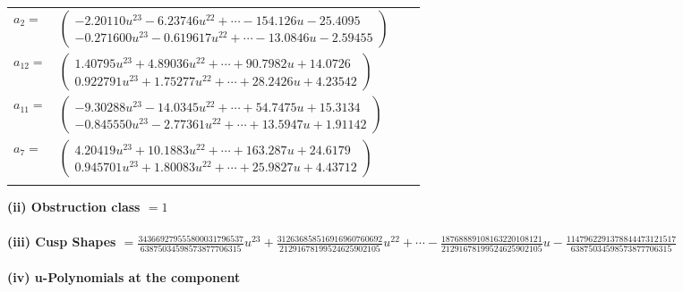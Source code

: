 \documentclass[1p]{elsarticle_modified}
\theoremstyle{definition}
\begin{document}
\begin{tabular}{m{7pt} m{180pt} m{7pt} m{180pt} }
\flushright $a_{2}=$&$\begin{pmatrix}-2.20110 u^{23}-6.23746 u^{22}+\cdots-154.126 u-25.4095\\-0.271600 u^{23}-0.619617 u^{22}+\cdots-13.0846 u-2.59455\end{pmatrix}$ \\
\flushright $a_{12}=$&$\begin{pmatrix}1.40795 u^{23}+4.89036 u^{22}+\cdots+90.7982 u+14.0726\\0.922791 u^{23}+1.75277 u^{22}+\cdots+28.2426 u+4.23542\end{pmatrix}$ \\
\flushright $a_{11}=$&$\begin{pmatrix}-9.30288 u^{23}-14.0345 u^{22}+\cdots+54.7475 u+15.3134\\-0.845550 u^{23}-2.77361 u^{22}+\cdots+13.5947 u+1.91142\end{pmatrix}$ \\
\flushright $a_{7}=$&$\begin{pmatrix}4.20419 u^{23}+10.1883 u^{22}+\cdots+163.287 u+24.6179\\0.945701 u^{23}+1.80083 u^{22}+\cdots+25.9827 u+4.43712\end{pmatrix}$\\&\end{tabular}
\flushleft \textbf{(ii) Obstruction class $= 1$}\\~\\
\flushleft \textbf{(iii) Cusp Shapes $= \frac{343669279555800031796537}{63875034598573877706315} u^{23}+\frac{312636858516916960760692}{21291678199524625902105} u^{22}+\cdots-\frac{18768889108163220108121}{21291678199524625902105} u-\frac{1147962291378844473121517}{63875034598573877706315}$}\\~\\
\newpage\renewcommand{\arraystretch}{1}
\flushleft \textbf{(iv) u-Polynomials at the component}\newline \\
\end{document}
